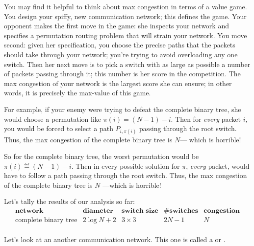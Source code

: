 \begin{staffnotes}

You may find it helpful to think about max congestion in terms of a value
game.  You design your spiffy, new communication network; this defines the
game.  Your opponent makes the first move in the game: she inspects your
network and specifies a permutation routing problem that will strain your
network.\iffalse
That is, her first move is a specification of which input terminals must
send a packet to which output terminals.
\fi
You move second: given her specification, you choose the precise paths
that the packets should take through your network; you're trying to avoid
overloading any one switch.  Then her next move is to pick a switch with
as large as possible a number of packets passing through it; this number
is her score in the competition.  The max congestion of your network is
the largest score she can ensure; in other words, it is precisely the
max-value of this game.

For example, if your enemy were trying to defeat the complete binary
tree, she would choose a permutation like $\pi(i) = (N - 1) - i$.
Then for \textit{every} packet $i$, you would be forced to select a
path $P_{i, \pi(i)}$ passing through the root switch.  Thus, the max
congestion of the complete binary tree is $N$--- which is horrible!

\end{staffnotes}

So for the complete binary tree, the worst permutation would be $\pi(i)
\eqdef (N - 1) - i$.  Then in every possible solution for $\pi$,
\textit{every} packet, would have to follow a path passing through the
root switch.  Thus, the max congestion of the complete binary tree is $N$
---which is horrible!

Let's tally the results of our analysis so far:
%
\[
\begin{array}{r|c|c|c|c}
\textbf{network} &
\textbf{diameter} &
\textbf{switch size} &
\textbf{\# switches} &
\textbf{congestion} \\ \hline
\text{complete binary tree} & 2 \log N + 2 & 3 \times 3 & 2N - 1 & N \\
\end{array}
\]

\label{2Darray}

Let's look at an another communication network.  This one is called a
 or .

